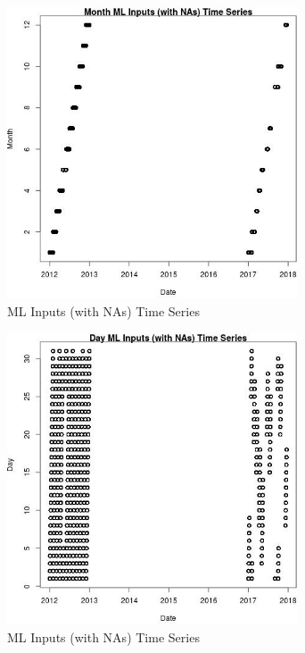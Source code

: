 \begin{figure} 
\centering  
\includegraphics[width=0.77\textwidth]{Code_Outputs/Report_ML_input_PM25_Step4_part_e_de_duplicated_aves_compiled_2019-05-14wNAs_MonthvDate.jpg} 
\caption{\label{fig:Report_ML_input_PM25_Step4_part_e_de_duplicated_aves_compiled_2019-05-14wNAsMonthvDate}ML Inputs (with NAs) Time Series} 
\end{figure} 
 

\begin{figure} 
\centering  
\includegraphics[width=0.77\textwidth]{Code_Outputs/Report_ML_input_PM25_Step4_part_e_de_duplicated_aves_compiled_2019-05-14wNAs_DayvDate.jpg} 
\caption{\label{fig:Report_ML_input_PM25_Step4_part_e_de_duplicated_aves_compiled_2019-05-14wNAsDayvDate}ML Inputs (with NAs) Time Series} 
\end{figure} 
 

